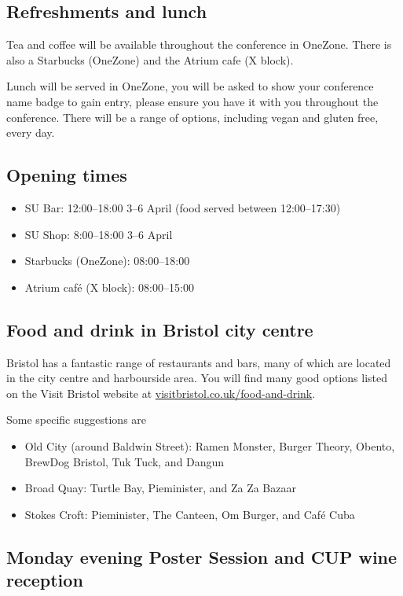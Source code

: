 \documentclass[12pt,a4paper]{article}
\begin{document}
\subsection{Refreshments and lunch}

Tea and coffee will be available throughout the conference in OneZone. There is also a Starbucks (OneZone) and the Atrium cafe (X block).

Lunch will be served in OneZone, you will be asked to show your conference name badge to gain entry, please ensure you have it with you throughout the conference. There will be a range of options, including vegan and gluten free, every day.

\subsection{Opening times}

\begin{itemize}
\item SU Bar: 12:00--18:00 3--6 April (food served between 12:00--17:30)
\item SU Shop: 8:00--18:00 3--6 April
\item Starbucks (OneZone): 08:00--18:00
\item Atrium café (X block): 08:00--15:00
\end{itemize}

\subsection{Food and drink in Bristol city centre}

Bristol has a fantastic range of restaurants and bars, many of which are located in the city centre and harbourside area. You will find many good options listed on the Visit Bristol website at \href{https://visitbristol.co.uk/food-and-drink}{visitbristol.co.uk/food-and-drink}.

Some specific suggestions are
\begin{itemize}
    \item Old City (around Baldwin Street): Ramen Monster, Burger Theory, Obento, BrewDog Bristol, Tuk Tuck, and Dangun
    \item Broad Quay: Turtle Bay, Pieminister, and Za Za Bazaar
    \item Stokes Croft: Pieminister, The Canteen, Om Burger, and Café Cuba
\end{itemize}

\subsection{Monday evening Poster Session and CUP wine reception}
\end{document}
